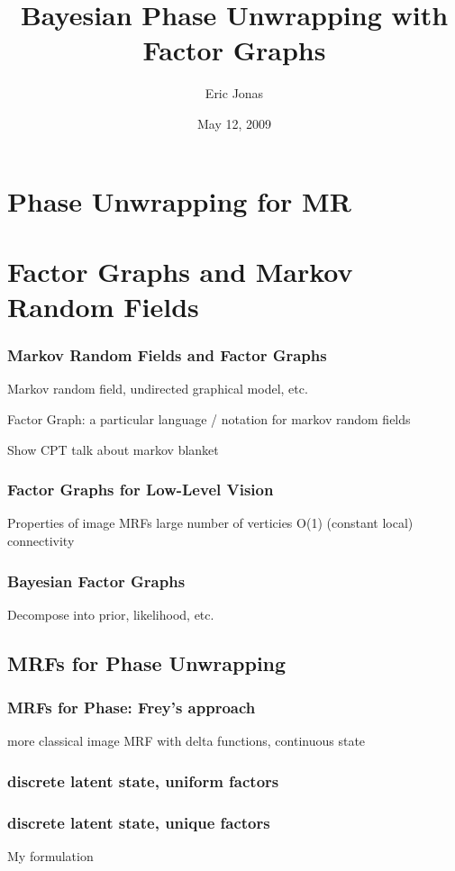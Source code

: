 \documentclass{beamer}
\title{Bayesian Phase Unwrapping with Factor Graphs}
\author{Eric Jonas}
\date{May 12, 2009}
\institute[6.556]{MIT Department of Brain and Cognitive Sciences}
\begin{document}
\begin{frame}
\maketitle
\end{frame}

\section{Phase Unwrapping for MR}


\section{Factor Graphs and Markov Random Fields}
\begin{frame}
\frametitle{Markov Random Fields and Factor Graphs}

Markov random field, undirected graphical model, etc. 

Factor Graph: a particular language / notation for markov random fields

Show CPT
talk about markov blanket

\cite{Kschischang01}

\end{frame}

\begin{frame} 
\frametitle{Factor Graphs for Low-Level Vision}
Properties of image MRFs
large number of verticies
O(1) (constant local) connectivity
\end{frame}

\begin{frame}
\frametitle{Bayesian Factor Graphs}
Decompose into prior, likelihood, etc. 
\end{frame}

\subsection{MRFs for Phase Unwrapping}

\begin{frame} 
\frametitle{MRFs for Phase: Frey's approach}
more classical image MRF with delta functions, continuous state
\end{frame}

\begin{frame}
\frametitle{discrete latent state, uniform factors}
\end{frame}

\begin{frame}
\frametitle{discrete latent state, unique factors}
My formulation

\end{frame} 
\end{document}
